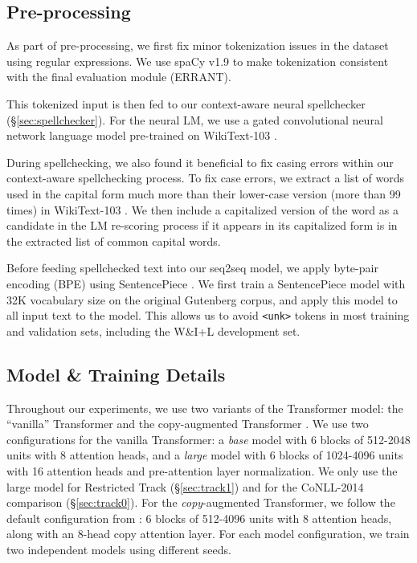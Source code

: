 \documentclass[11pt,a4paper]{article}
\begin{document}
\subsection{Pre-processing}

As part of pre-processing, we first fix minor tokenization issues in the dataset using regular expressions.
We use spaCy v1.9 \cite{honnibal2017spacy} to make tokenization consistent with the final evaluation module (ERRANT).

This tokenized input is then fed to our context-aware neural spellchecker (\S\ref{sec:spellchecker}).
For the neural LM, we use a gated convolutional neural network language model \cite{dauphin2017language} pre-trained on WikiText-103 \cite{merity2016pointer}. 

During spellchecking, we also found it beneficial to fix casing errors within our context-aware spellchecking process. 
To fix case errors, we extract a list of words used in the capital form much more than their lower-case version (more than 99 times) in WikiText-103 \cite{merity2016pointer}. 
We then include a capitalized version of the word as a candidate in the LM re-scoring process if it appears in its capitalized form is in the extracted list of common capital words. 

Before feeding spellchecked text into our seq2seq model, we apply byte-pair encoding (BPE) \cite{sennrich2016neural} using SentencePiece \cite{kudo2018sentencepiece}. 
We first train a SentencePiece model with 32K vocabulary size on the original Gutenberg corpus, and apply this model to all input text to the model. 
This allows us to avoid \texttt{<unk>} tokens in most training and validation sets, including the W\&I+L development set. 


\subsection{Model \& Training Details}

Throughout our experiments, we use two variants of the Transformer model: the ``vanilla'' Transformer \cite{vaswani2017attention} and the copy-augmented Transformer \cite{zhao2019improving}. 
We use two configurations for the vanilla Transformer: a \textit{base} model with 6 blocks of 512-2048 units with 8 attention heads, and a \textit{large} model with 6 blocks of 1024-4096 units with 16 attention heads and pre-attention layer normalization.
We only use the large model for Restricted Track (\S\ref{sec:track1}) and for the CoNLL-2014 comparison (\S\ref{sec:track0}). 
For the \textit{copy}-augmented Transformer, we follow the default configuration from \cite{zhao2019improving}: 6 blocks of 512-4096 units with 8 attention heads, along with an 8-head copy attention layer. 
For each model configuration, we train two independent models using different seeds.
\end{document}

